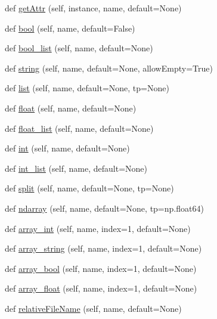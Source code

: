 \begin{DoxyCompactItemize}
\item 
def \mbox{\hyperlink{classgetdist_1_1inifile_1_1IniFile_aaab553c427125848cdb7c083e8e79a2d}{get\+Attr}} (self, instance, name, default=None)
\item 
def \mbox{\hyperlink{classgetdist_1_1inifile_1_1IniFile_a6f6192fc30f45202f5675ecd70856010}{bool}} (self, name, default=False)
\item 
def \mbox{\hyperlink{classgetdist_1_1inifile_1_1IniFile_a3e462a0dea71c6a61530a420c38b597b}{bool\+\_\+list}} (self, name, default=None)
\item 
def \mbox{\hyperlink{classgetdist_1_1inifile_1_1IniFile_aaff273830dd59c896a75b71391677d99}{string}} (self, name, default=None, allow\+Empty=True)
\item 
def \mbox{\hyperlink{classgetdist_1_1inifile_1_1IniFile_ab16c07aad361f648bc04bd646ccabc68}{list}} (self, name, default=None, tp=None)
\item 
def \mbox{\hyperlink{classgetdist_1_1inifile_1_1IniFile_ae6d8dedd31b32977a6a1340e6bbcf04f}{float}} (self, name, default=None)
\item 
def \mbox{\hyperlink{classgetdist_1_1inifile_1_1IniFile_a0fe37e4aafe74c0bea80d1e7912e3d63}{float\+\_\+list}} (self, name, default=None)
\item 
def \mbox{\hyperlink{classgetdist_1_1inifile_1_1IniFile_a5b90359abae63c212ee90f077abe8ad9}{int}} (self, name, default=None)
\item 
def \mbox{\hyperlink{classgetdist_1_1inifile_1_1IniFile_a2662f801bfbe7d2a7e20c4f734318a69}{int\+\_\+list}} (self, name, default=None)
\item 
def \mbox{\hyperlink{classgetdist_1_1inifile_1_1IniFile_a3a4d9c8fd7a2274730473c3df2f5a44e}{split}} (self, name, default=None, tp=None)
\item 
def \mbox{\hyperlink{classgetdist_1_1inifile_1_1IniFile_a18e5f6bbc80b9ab0b7e9ebeff9eff3ec}{ndarray}} (self, name, default=None, tp=np.\+float64)
\item 
def \mbox{\hyperlink{classgetdist_1_1inifile_1_1IniFile_a7a2d4f1f5cd18de58f68f53e5111baf3}{array\+\_\+int}} (self, name, index=1, default=None)
\item 
def \mbox{\hyperlink{classgetdist_1_1inifile_1_1IniFile_a274b4bdc84fb9806adf1d36dd2a7d0ba}{array\+\_\+string}} (self, name, index=1, default=None)
\item 
def \mbox{\hyperlink{classgetdist_1_1inifile_1_1IniFile_aa3eae602ee8edc5f78f1cb63dbb8f138}{array\+\_\+bool}} (self, name, index=1, default=None)
\item 
def \mbox{\hyperlink{classgetdist_1_1inifile_1_1IniFile_a6ffefc5aa732378e03adde8b83e88b96}{array\+\_\+float}} (self, name, index=1, default=None)
\item 
def \mbox{\hyperlink{classgetdist_1_1inifile_1_1IniFile_aa45dd09190b83f711db6d9ab55605f50}{relative\+File\+Name}} (self, name, default=None)
\end{DoxyCompactItemize}

